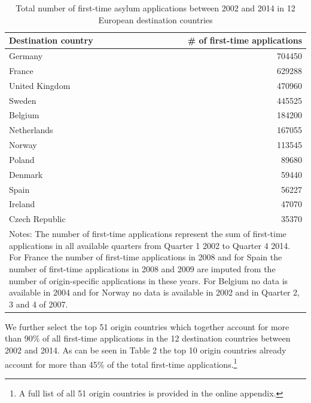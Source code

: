 \documentclass[a4paper,12pt]{article}
\begin{document}
\begin{table}[htbp]\centering
\caption{Total number of first-time asylum applications between 2002 and 2014 in 12 European destination countries}
\begin{tabular}{l r}
\hline \hline
\textbf{Destination country} & \textbf{\# of first-time  applications}  \\
\hline \hline
\smallskip
Germany &  704450 \\
\smallskip
France & 629288 \\
\smallskip
United Kingdom & 470960 \\
\smallskip
Sweden & 445525 \\
\smallskip
Belgium & 184200 \\
\smallskip
Netherlands & 167055 \\
\smallskip
Norway & 113545 \\
\smallskip 
Poland & 89680 \\
\smallskip
Denmark & 59440 \\
\smallskip
Spain & 56227 \\
\smallskip
Ireland & 47070 \\
\smallskip
Czech Republic & 35370 \\
\hline \hline
\multicolumn{2}{p{10cm}}{\footnotesize{Notes: The number of first-time applications represent the sum of  first-time applications in all available quarters from Quarter 1 2002 to Quarter 4 2014. For France the number of first-time applications in 2008 and for  Spain the number of first-time applications in 2008 and 2009 are imputed from the number of origin-specific applications in these years. For Belgium no data is available in 2004 and for Norway no data is available in 2002 and in Quarter 2, 3 and 4 of 2007.}}
\end{tabular}
\end{table}

We further select the top 51 origin countries which together account for more than 90\% of all first-time applications in the 12 destination countries between 2002 and 2014. As can be seen in Table 2 the top 10 origin countries already account for more than 45\% of the total first-time applications.\footnote{A full list of all 51 origin countries is provided in the online appendix. }
\end{document}
